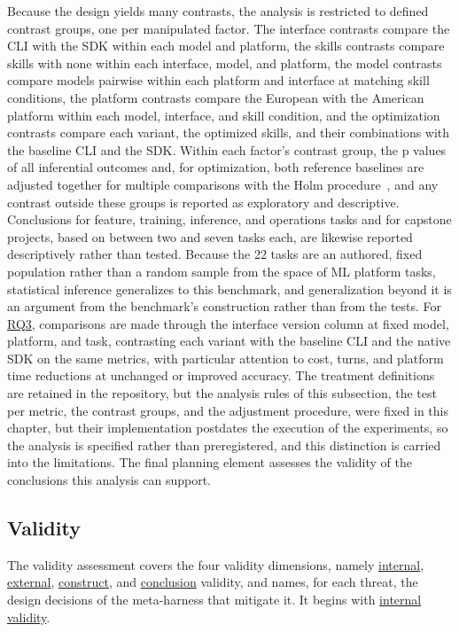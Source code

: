 \documentclass[
english,                 %
bibtex,                  %
]{kththesis}
\numberwithin{listing}{chapter}
\begin{document}
Because the design yields many contrasts, the analysis is restricted to defined contrast groups, one per manipulated factor. The interface contrasts compare the \gls{CLI} with the \gls{SDK} within each model and platform, the skills contrasts compare skills with none within each interface, model, and platform, the model contrasts compare models pairwise within each platform and interface at matching skill conditions, the platform contrasts compare the European with the American platform within each model, interface, and skill condition, and the optimization contrasts compare each variant, the optimized skills, and their combinations with the baseline \gls{CLI} and the \gls{SDK}. Within each factor's contrast group, the p values of all inferential outcomes and, for optimization, both reference baselines are adjusted together for multiple comparisons with the Holm procedure~\cite{holm_simple_1979}, and any contrast outside these groups is reported as exploratory and descriptive. Conclusions for feature, training, inference, and operations tasks and for capstone projects, based on between two and seven tasks each, are likewise reported descriptively rather than tested. Because the 22 tasks are an authored, fixed population rather than a random sample from the space of \gls{ML} platform tasks, statistical inference generalizes to this benchmark, and generalization beyond it is an argument from the benchmark's construction rather than from the tests. For \hyperref[rq3]{RQ3}, comparisons are made through the interface version column at fixed model, platform, and task, contrasting each variant with the baseline \gls{CLI} and the native \gls{SDK} on the same metrics, with particular attention to cost, turns, and platform time reductions at unchanged or improved accuracy. The treatment definitions are retained in the repository, but the analysis rules of this subsection, the test per metric, the contrast groups, and the adjustment procedure, were fixed in this chapter, but their implementation postdates the execution of the experiments, so the analysis is specified rather than preregistered, and this distinction is carried into the limitations. The final planning element assesses the validity of the conclusions this analysis can support.

\subsection{Validity}
\label{sec:method_validity}
\glsresetall

The validity assessment covers the four validity dimensions, namely \hyperref[sec:method_internal_validity]{internal}, \hyperref[sec:method_external_validity]{external}, \hyperref[sec:method_construct_validity]{construct}, and \hyperref[sec:method_conclusion_validity]{conclusion} validity, and names, for each threat, the design decisions of the meta-harness that mitigate it. It begins with \hyperref[sec:method_internal_validity]{internal validity}.
\end{document}
